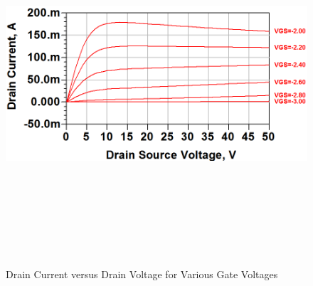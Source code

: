 \begin{figure}
  \centering
  \includegraphics[width=5in,height=5in,keepaspectratio]{figures/simulation/ids_versus_vds}\\
  \caption{Drain Current versus Drain Voltage for Various Gate Voltages}
  \label{fig:ids_versus_vds}
\end{figure}

